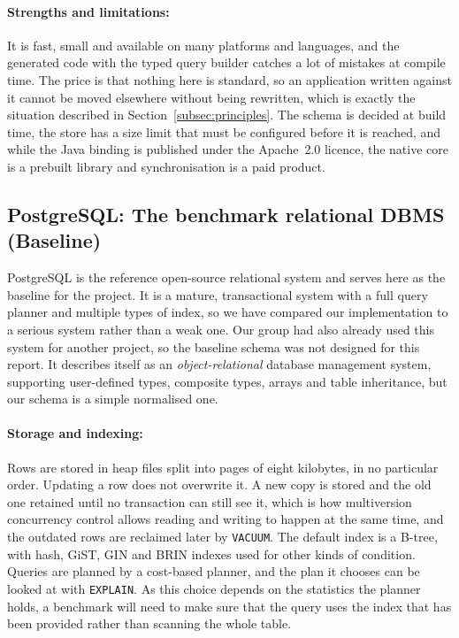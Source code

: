 \documentclass{article}
\begin{document}
\paragraph{Strengths and limitations:} It is fast, small and available on many
platforms and languages, and the generated code with the typed query builder
catches a lot of mistakes at compile time. The price is that nothing here is
standard, so an application written against it cannot be moved elsewhere without
being rewritten, which is exactly the situation described in
Section~\ref{subsec:principles}. The schema is decided at build time, the store
has a size limit that must be configured before it is reached, and while the Java
binding is published under the Apache~2.0 licence\cite{objectbox_github}, the
native core is a prebuilt library and synchronisation is a paid product.

\subsection{PostgreSQL: The benchmark relational DBMS (Baseline)}

PostgreSQL is the reference open-source relational system and serves here as the
baseline for the project. It is a mature, transactional system with a full query
planner and multiple types of index, so we have compared our implementation to a
serious system rather than a weak one. Our group had also already used this
system for another project, so the baseline schema was not designed for this
report. It describes itself as an \emph{object-relational} database management
system, supporting user-defined types, composite types, arrays and table
inheritance\cite{postgres_doc}, but our schema is a simple normalised one.

\paragraph{Storage and indexing:} Rows are stored in heap files split into pages
of eight kilobytes, in no particular order. Updating a row does not overwrite it.
A new copy is stored and the old one retained until no transaction can still see
it, which is how multiversion concurrency control allows reading and writing to
happen at the same time, and the outdated rows are reclaimed later by
\texttt{VACUUM}. The default index is a B-tree, with hash, GiST, GIN and BRIN
indexes used for other kinds of condition. Queries are planned by a cost-based
planner, and the plan it chooses can be looked at with
\texttt{EXPLAIN}\cite{postgres_doc}. As this choice depends on the statistics the
planner holds, a benchmark will need to make sure that the query uses the index
that has been provided rather than scanning the whole table.
\end{document}
